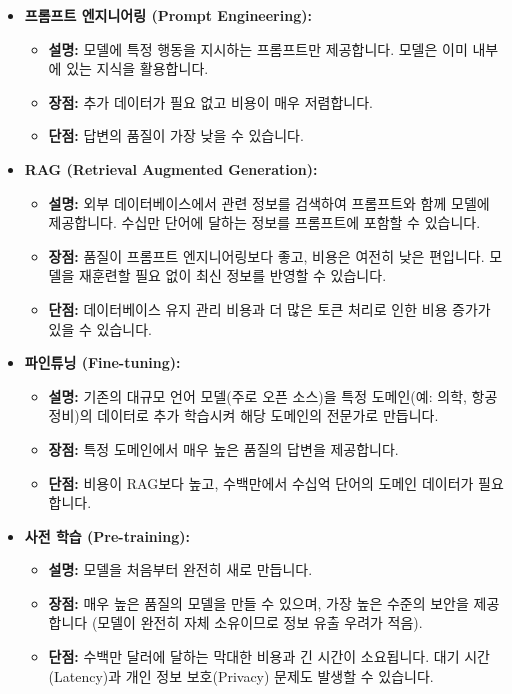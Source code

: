\documentclass[11pt,a4paper]{article}
\begin{document}
\begin{itemize}
    \item \textbf{프롬프트 엔지니어링 (Prompt Engineering):}
    \begin{itemize}
        \item \textbf{설명:} 모델에 특정 행동을 지시하는 프롬프트만 제공합니다. 모델은 이미 내부에 있는 지식을 활용합니다.
        \item \textbf{장점:} 추가 데이터가 필요 없고 비용이 매우 저렴합니다.
        \item \textbf{단점:} 답변의 품질이 가장 낮을 수 있습니다.
    \end{itemize}

    \item \textbf{RAG (Retrieval Augmented Generation):}
    \begin{itemize}
        \item \textbf{설명:} 외부 데이터베이스에서 관련 정보를 검색하여 프롬프트와 함께 모델에 제공합니다. 수십만 단어에 달하는 정보를 프롬프트에 포함할 수 있습니다.
        \item \textbf{장점:} 품질이 프롬프트 엔지니어링보다 좋고, 비용은 여전히 낮은 편입니다. 모델을 재훈련할 필요 없이 최신 정보를 반영할 수 있습니다.
        \item \textbf{단점:} 데이터베이스 유지 관리 비용과 더 많은 토큰 처리로 인한 비용 증가가 있을 수 있습니다.
    \end{itemize}

    \item \textbf{파인튜닝 (Fine-tuning):}
    \begin{itemize}
        \item \textbf{설명:} 기존의 대규모 언어 모델(주로 오픈 소스)을 특정 도메인(예: 의학, 항공 정비)의 데이터로 추가 학습시켜 해당 도메인의 전문가로 만듭니다.
        \item \textbf{장점:} 특정 도메인에서 매우 높은 품질의 답변을 제공합니다.
        \item \textbf{단점:} 비용이 RAG보다 높고, 수백만에서 수십억 단어의 도메인 데이터가 필요합니다.
    \end{itemize}

    \item \textbf{사전 학습 (Pre-training):}
    \begin{itemize}
        \item \textbf{설명:} 모델을 처음부터 완전히 새로 만듭니다.
        \item \textbf{장점:} 매우 높은 품질의 모델을 만들 수 있으며, 가장 높은 수준의 보안을 제공합니다 (모델이 완전히 자체 소유이므로 정보 유출 우려가 적음).
        \item \textbf{단점:} 수백만 달러에 달하는 막대한 비용과 긴 시간이 소요됩니다. 대기 시간(Latency)과 개인 정보 보호(Privacy) 문제도 발생할 수 있습니다.
    \end{itemize}
\end{itemize}
\end{document}
